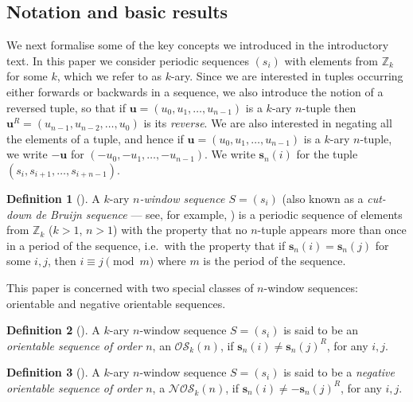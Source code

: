 \documentclass[a4paper,11pt]{article}
\theoremstyle{plain}
\theoremstyle{definition}
\newtheorem{definition}{Definition}[section]
\theoremstyle{remark}
\begin{document}
\subsection{Notation and basic results}  \label{subsection:notation}

We next formalise some of the key concepts we introduced in the introductory text. In this paper we
consider periodic sequences $(s_i)$ with elements from $\mathbb{Z}_k$ for some $k$, which we refer
to as $k$-ary. Since we are interested in tuples occurring either forwards or backwards in a
sequence, we also introduce the notion of a reversed tuple, so that if $\mathbf{u} =
(u_0,u_1,\ldots,u_{n-1})$ is a $k$-ary $n$-tuple then $\mathbf{u}^R = (u_{n-1},u_{n-2},
\ldots,u_0)$ is its \emph{reverse}.  We are also interested in negating all the elements of a
tuple, and hence if $\mathbf{u} = (u_0,u_1,\ldots,u_{n-1})$ is a $k$-ary $n$-tuple, we write
$-\mathbf{u}$ for $(-u_0,-u_1,\ldots,-u_{n-1})$. We write $\mathbf{s}_n(i)$ for the tuple
$(s_i,s_{i+1},\ldots,s_{i+n-1})$.

\begin{definition}[\cite{Alhakim24a}]
A $k$-ary \emph{$n$-window sequence $S = (s_i)$} (also known as a \emph{cut-down de Bruijn
sequence} --- see, for example, \cite{cameron25}) is a periodic sequence of elements from
$\mathbb{Z}_k$ ($k>1$, $n>1$) with the property that no $n$-tuple appears more than once in a
period of the sequence, i.e.\ with the property that if $\mathbf{s}_n(i) = \mathbf{s}_n(j)$ for
some $i,j$, then $i \equiv j \pmod m$ where $m$ is the period of the sequence.
\end{definition}

This paper is concerned with two special classes of $n$-window sequences: orientable and negative
orientable sequences.

\begin{definition}[\cite{Alhakim24a}] A $k$-ary $n$-window sequence $S = (s_i)$ is
said to be an \emph{orientable sequence of order $n$}, an $\mathcal{OS}_k(n)$, if $\mathbf{s}_n(i)
\neq \mathbf{s}_n(j)^R$, for any $i,j$.
\end{definition}

\begin{definition}[\cite{Alhakim24a}]  \label{definition:NOS}
A $k$-ary $n$-window sequence $S=(s_i)$ is said to be a \emph{negative orientable sequence of order
$n$}, a $\mathcal{NOS}_k(n)$, if $\mathbf{s}_n(i)\not=-{\mathbf{s}_n(j)}^R$, for any $i,j$.
\end{definition}
\end{document}
